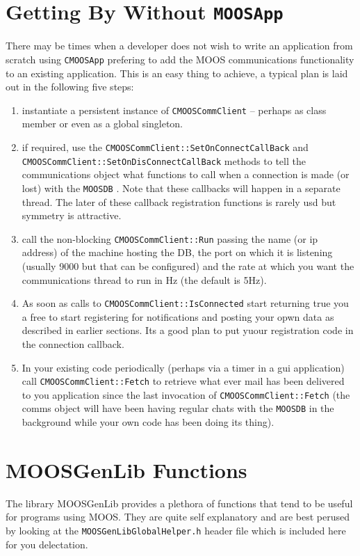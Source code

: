 \documentclass[a4paper,10pt]{article}
\newcommand{\Code}[1]{\texttt{#1} }
\newcommand{\code}[1]{\Code{#1} }
\begin{document}
\section{Getting By Without \code{MOOSApp}}


There may be times when a developer does not wish to write an application from scratch using \code{CMOOSApp} prefering to add the MOOS communications functionality to an existing application. This is an easy thing to achieve, a typical plan is laid out in the following five steps:

\begin{enumerate}
\item instantiate a persistent instance of \code{CMOOSCommClient} -- perhaps as class member or even as a global singleton.
\item if required, use the \code{CMOOSCommClient::SetOnConnectCallBack} and \code{CMOOSCommClient::SetOnDisConnectCallBack} methods to tell the communications object what functions to call when a connection is made (or lost) with the \code{MOOSDB}. Note that these callbacks will happen in a separate thread. The later of these callback registration functions is rarely usd but symmetry is attractive.
\item call the non-blocking \code{CMOOSCommClient::Run} passing the name (or ip address) of the machine hosting the DB, the port on which it is listening (usually 9000 but that can be configured) and the rate at which you want the communications thread to run in Hz (the default is 5Hz).
\item As soon as calls to \code{CMOOSCommClient::IsConnected} start returning true you a free to start registering for notifications and posting your opwn data as described in earlier sections. Its a good plan to put yuour registration code in the connection callback.
\item In your existing code periodically (perhaps via a timer in a gui application) call \code{CMOOSCommClient::Fetch} to retrieve what ever mail has been delivered to you application since the last invocation of \code{CMOOSCommClient::Fetch} (the comms object will have been having regular chats with the \code{MOOSDB} in the background while your own code has been doing its thing).
\end{enumerate}










\section{MOOSGenLib Functions}\label{Sec:MOOSGenLib}

The library MOOSGenLib provides a plethora of functions that tend
to be useful for programs using MOOS. They are quite self
explanatory and are best perused by looking at the
\code{MOOSGenLibGlobalHelper.h} header file which is included here
for you delectation. 
\end{document}
